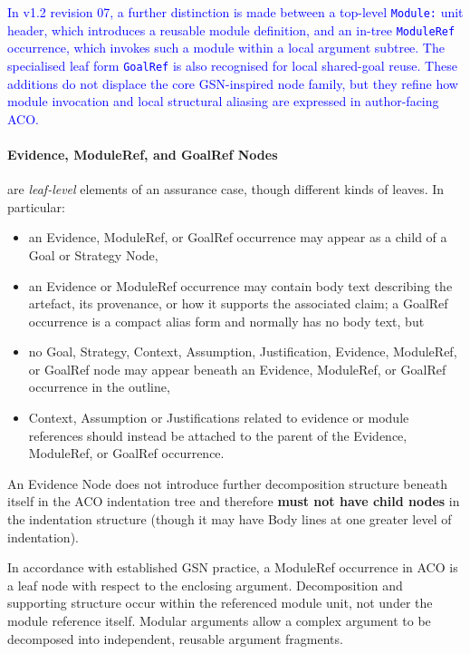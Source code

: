 \documentclass[11pt,twoside,a4paper]{article}
\begin{document}
\textcolor{blue}{In v1.2 revision 07, a further distinction is made between a top-level \texttt{Module:} unit header, which introduces a reusable module definition, and an in-tree \texttt{ModuleRef} occurrence, which invokes such a module within a local argument subtree. The specialised leaf form \texttt{GoalRef} is also recognised for local shared-goal reuse. These additions do not displace the core GSN-inspired node family, but they refine how module invocation and local structural aliasing are expressed in author-facing ACO.}

\paragraph{Evidence, ModuleRef, and GoalRef Nodes} are \emph{leaf-level} elements of an assurance case, though different kinds of leaves.
In particular:
\begin{itemize}[leftmargin=2em]
  \item an Evidence, ModuleRef, or GoalRef occurrence may appear as a child of a Goal or Strategy Node,
  \item an Evidence or ModuleRef occurrence may contain body text describing the artefact, its provenance,
        or how it supports the associated claim; a GoalRef occurrence is a compact alias form and normally has no body text, but
  \item no Goal, Strategy, Context, Assumption, Justification, Evidence, ModuleRef, or GoalRef node
        may appear beneath an Evidence, ModuleRef, or GoalRef occurrence in the outline,
  \item Context, Assumption or Justifications related to evidence or module references should instead be attached to the parent of the Evidence, ModuleRef, or GoalRef occurrence.
\end{itemize}

An Evidence Node
does not introduce further decomposition structure beneath itself in the ACO indentation tree and therefore
\textbf{must not have child nodes} in the indentation structure (though it may have Body lines at one greater level of indentation).

In accordance with established GSN practice, a ModuleRef occurrence in ACO is a leaf node with respect to the enclosing argument. Decomposition and supporting structure occur within the referenced module unit, not under the module reference itself.
Modular arguments allow a complex argument to be decomposed into independent, reusable argument fragments.
\end{document}
